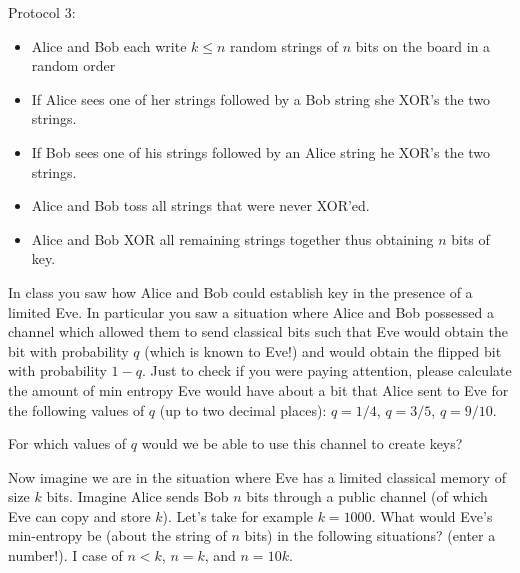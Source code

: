 \documentclass[a4paper,10pt,landscape,twocolumn]{scrartcl}
\begin{document}
\begin{exercise}
      Protocol 3:
    \begin{itemize}
\setlength\itemsep{0em}
\item Alice and Bob each write $k\leq n $ random strings of $n$ bits on the board in a random order
\item If Alice sees one of her strings followed by a Bob string she XOR's the two strings.
\item If Bob sees one of his strings followed by an Alice string he XOR's the two strings.
\item Alice and Bob toss all strings that were never XOR'ed.
\item Alice and Bob XOR all remaining strings together thus obtaining $n$ bits of key.
\end{itemize}   

\end{exercise}

\begin{exercise}
\begin{subex}[Problem 2.1]
In class you saw how Alice and Bob could establish key in the presence of a limited Eve. In particular you saw a situation where Alice and Bob possessed a channel which allowed them to send classical bits such that Eve would obtain the bit with probability $q$ (which is known to Eve!) and would obtain the flipped bit with probability $1-q$. Just to check if you were paying attention, please calculate the amount of min entropy Eve would have about a bit that Alice sent to Eve for the following values of $q$ (up to two decimal places): $q=1/4$, $q=3/5$, $q=9/10$.
\end{subex}

\begin{subex}[Problem 2.2]
For which values of $q$ would we be able to use this channel to create keys?
\end{subex}

\begin{subex}[Problem 2.3]
Now imagine we are in the situation where Eve has a limited classical memory of size $k$ bits. Imagine Alice sends Bob $n$ bits through a public channel (of which Eve can copy and store $k$). Let's take for example $k=1000$. What would Eve's min-entropy be (about the string of $n$ bits) in the following situations? (enter a number!). I case of $n<k$, $n=k$, and $n=10k$.
\end{subex}
\end{exercise}
\end{document}
